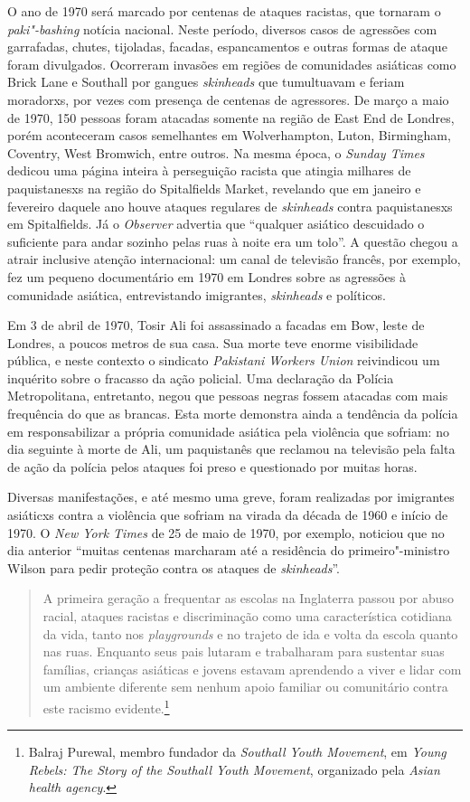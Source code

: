 O ano de 1970 será marcado por centenas de ataques racistas, que tornaram o \emph{paki"-bashing} notícia nacional. Neste período, diversos casos de agressões com garrafadas, chutes, tijoladas, facadas, espancamentos e outras formas de ataque foram divulgados. Ocorreram invasões em regiões de comunidades asiáticas como Brick Lane e Southall por gangues \emph{skinheads} que tumultuavam e feriam moradorxs, por vezes com presença de centenas de agressores. De março a maio de 1970, 150 pessoas foram atacadas somente na região de East End de Londres, porém aconteceram casos semelhantes em Wolverhampton, Luton, Birmingham, Coventry, West Bromwich, entre outros. Na mesma época, o \emph{Sunday Times} dedicou uma página inteira à perseguição racista que atingia milhares de paquistanesxs na região do Spitalfields Market, revelando que em janeiro e fevereiro daquele ano houve ataques regulares de \emph{skinheads} contra paquistanesxs em Spitalfields. Já o \emph{Observer} advertia que ``qualquer asiático descuidado o suficiente para andar sozinho pelas ruas à noite era um tolo''. A questão chegou a atrair inclusive atenção internacional: um canal de televisão francês, por exemplo, fez um pequeno documentário em 1970 em Londres sobre as agressões à comunidade asiática, entrevistando imigrantes, \emph{skinheads} e políticos.

Em 3 de abril de 1970, Tosir Ali foi assassinado a facadas em Bow, leste de Londres, a poucos metros de sua casa. Sua morte teve enorme visibilidade pública, e neste contexto o sindicato \emph{Pakistani Workers Union} reivindicou um inquérito sobre o fracasso da ação policial. Uma declaração da Polícia Metropolitana, entretanto, negou que pessoas negras fossem atacadas com mais frequência do que as brancas. Esta morte demonstra ainda a tendência da polícia em responsabilizar a própria comunidade asiática pela violência que sofriam: no dia seguinte à morte de Ali, um paquistanês que reclamou na televisão pela falta de ação da polícia pelos ataques foi preso e questionado por muitas horas.

Diversas manifestações, e até mesmo uma greve, foram realizadas por imigrantes asiáticxs contra a violência que sofriam na virada da década de 1960 e início de 1970. O \emph{New York Times} de 25 de maio de 1970, por exemplo, noticiou que no dia anterior ``muitas centenas marcharam até a residência do primeiro"-ministro Wilson para pedir proteção contra os ataques de \emph{skinheads}''.

\begin{quote}
A primeira geração a frequentar as escolas na Inglaterra passou por abuso racial, ataques racistas e discriminação como uma característica cotidiana da vida, tanto nos \emph{playgrounds} e no trajeto de ida e volta da escola quanto nas ruas. Enquanto seus pais lutaram e trabalharam para sustentar suas famílias, crianças asiáticas e jovens estavam aprendendo a viver e lidar com um ambiente diferente sem nenhum apoio familiar ou comunitário contra este racismo evidente.\footnote{Balraj Purewal, membro fundador da \emph{Southall Youth Movement}, em \emph{Young Rebels: The Story of the Southall Youth Movement}, organizado pela \emph{Asian health agency}.}
\end{quote}

